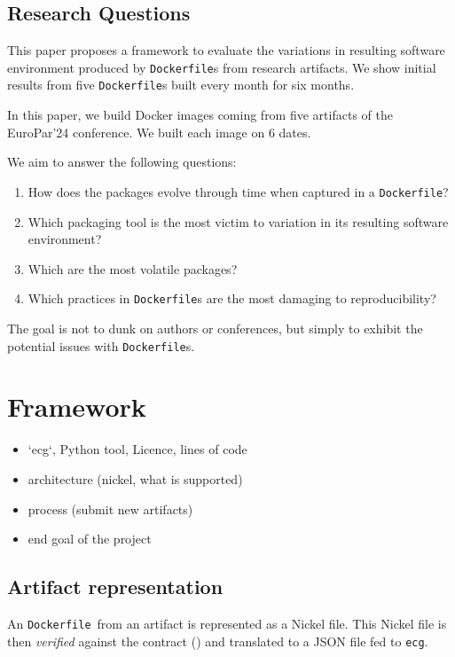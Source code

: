 \documentclass[sigconf,natbib=false]{acmart}
\newcommand{\df}{\texttt{Dockerfile}}
\newcommand{\todo}[1]{{\color{red}{TODO: #1}}}
\begin{document}
\subsection{Research Questions}


This paper proposes a framework to evaluate the variations in resulting software environment produced by \texttt{Dockerfile}s from research artifacts.
We show initial results from five \texttt{Dockerfile}s built every month for six months.

In this paper, we build Docker images coming from five artifacts of the EuroPar'24 conference.
We built each image on 6 dates.


We aim to answer the following questions:

\begin{enumerate}
\item How does the packages evolve through time when captured in a \texttt{Dockerfile}?
\item Which packaging tool is the most victim to variation in its resulting software environment?
\item Which are the most volatile packages?
\item Which practices in \df s are the most damaging to reproducibility?
\end{enumerate}


The goal is not to dunk on authors or conferences, but simply to exhibit the potential issues with \texttt{Dockerfile}s.

\newpage
\section{Framework}

\begin{itemize}
\item `ecg`, Python tool, Licence, lines of code
\item architecture (nickel, what is supported)
\item process (submit new artifacts)
\item end goal of the project
\end{itemize}

\subsection{Artifact representation}

An \df\ from an artifact is represented as a Nickel \cite{nickel} file.
This Nickel file is then \emph{verified} against the contract (\todo{link to contract}) and translated to a JSON file fed to \texttt{ecg}.
\end{document}
